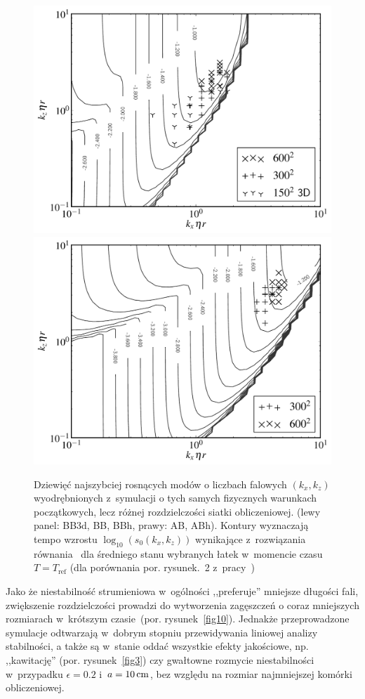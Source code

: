 \begin{figure}
  \includegraphics[width=0.48\linewidth]{figures/fig9a}
  \includegraphics[width=0.48\linewidth]{figures/fig9b}
  \caption[Ewolucja najszybciej rosnących modów niestabilności strumieniowej w
  symulacjach BB3d, BB, BBh oraz AB, ABh.]
    {Dziewięć najszybciej rosnących modów o liczbach falowych $(k_x, k_z)$
     wyodrębnionych z~symulacji o tych samych fizycznych warunkach początkowych,
     lecz różnej rozdzielczości siatki obliczeniowej. (lewy panel: BB3d, BB,
     BBh, prawy: AB, ABh). Kontury wyznaczają tempo wzrostu $\log_{10}( s_0(k_x,
  k_z))$ wynikające z~rozwiązania równania~  dla średniego
  stanu wybranych łatek w~momencie czasu  $T = T_{\textrm{ref}}$ (dla porównania
  por. rysunek.~2 z~pracy~\cite{YG05})}
   \label{fig9}
\end{figure}
%
\par Jako że niestabilność strumieniowa w~ogólności ,,preferuje'' mniejsze
długości fali, zwiększenie rozdzielczości prowadzi do wytworzenia
 zagęszczeń o coraz mniejszych rozmiarach w~krótszym czasie~(por.
rysunek~\ref{fig10}).  Jednakże przeprowadzone symulacje odtwarzają w~dobrym
stopniu przewidywania liniowej analizy stabilności, a także są w~stanie oddać
wszystkie efekty jakościowe, np. ,,kawitację'' (por. rysunek~\ref{fig3}) czy
gwałtowne rozmycie niestabilności w~przypadku $\epsilon=0.2$ i~$a=10\hbox{$\thinspace\textrm{cm}$}$, bez
względu na rozmiar najmniejszej komórki obliczeniowej.

